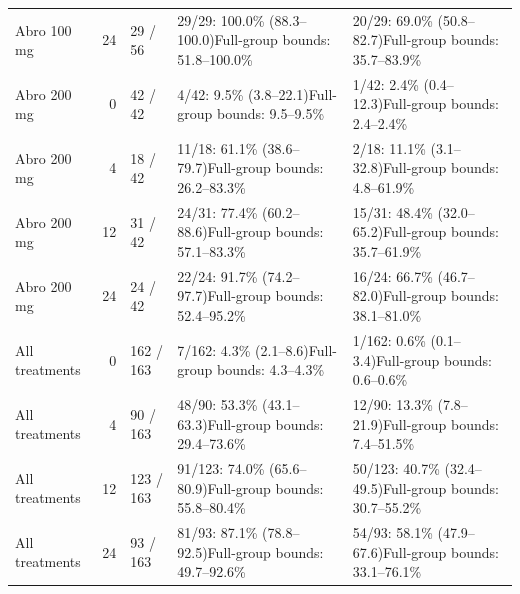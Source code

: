 {\begin{longtable}{p{24mm}rp{20mm}p{50mm}p{50mm}}
Abro 100 mg & 24 & 29 / 56 & 29/29: 100.0\% (88.3--100.0)\newline Full-group bounds: 51.8--100.0\% & 20/29: 69.0\% (50.8--82.7)\newline Full-group bounds: 35.7--83.9\% \\[4pt]
\addlinespace
Abro 200 mg & 0 & 42 / 42 & 4/42: 9.5\% (3.8--22.1)\newline Full-group bounds: 9.5--9.5\% & 1/42: 2.4\% (0.4--12.3)\newline Full-group bounds: 2.4--2.4\% \\[4pt]
Abro 200 mg & 4 & 18 / 42 & 11/18: 61.1\% (38.6--79.7)\newline Full-group bounds: 26.2--83.3\% & 2/18: 11.1\% (3.1--32.8)\newline Full-group bounds: 4.8--61.9\% \\[4pt]
Abro 200 mg & 12 & 31 / 42 & 24/31: 77.4\% (60.2--88.6)\newline Full-group bounds: 57.1--83.3\% & 15/31: 48.4\% (32.0--65.2)\newline Full-group bounds: 35.7--61.9\% \\[4pt]
Abro 200 mg & 24 & 24 / 42 & 22/24: 91.7\% (74.2--97.7)\newline Full-group bounds: 52.4--95.2\% & 16/24: 66.7\% (46.7--82.0)\newline Full-group bounds: 38.1--81.0\% \\[4pt]
\addlinespace
All treatments & 0 & 162 / 163 & 7/162: 4.3\% (2.1--8.6)\newline Full-group bounds: 4.3--4.3\% & 1/162: 0.6\% (0.1--3.4)\newline Full-group bounds: 0.6--0.6\% \\[4pt]
All treatments & 4 & 90 / 163 & 48/90: 53.3\% (43.1--63.3)\newline Full-group bounds: 29.4--73.6\% & 12/90: 13.3\% (7.8--21.9)\newline Full-group bounds: 7.4--51.5\% \\[4pt]
All treatments & 12 & 123 / 163 & 91/123: 74.0\% (65.6--80.9)\newline Full-group bounds: 55.8--80.4\% & 50/123: 40.7\% (32.4--49.5)\newline Full-group bounds: 30.7--55.2\% \\[4pt]
All treatments & 24 & 93 / 163 & 81/93: 87.1\% (78.8--92.5)\newline Full-group bounds: 49.7--92.6\% & 54/93: 58.1\% (47.9--67.6)\newline Full-group bounds: 33.1--76.1\% \\[4pt]

\end{longtable}}
